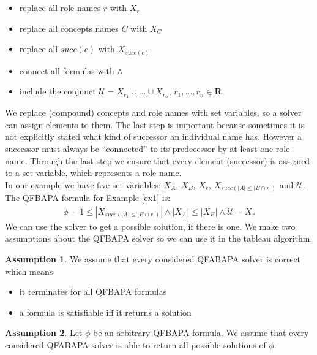 \documentclass{book}
\theoremstyle{break}
\theoremstyle{definition}
\newtheorem{assumption}{Assumption}
\begin{document}
\begin{itemize}
\item replace all role names $r$ with $X_r$
\item replace all concepts names $C$ with $X_C$
\item replace all $succ(c)$ with $X_{succ(c)}$
\item connect all formulas with $\wedge$
\item include the conjunct $\mathcal{U}=X_{r_1}\cup\dots\cup X_{r_n}$, $r_1,\dots, r_n\in\mathbf{R}$
\end{itemize}
We replace (compound) concepts and role names with set variables, so a solver can assign elements to them. The last step is important because sometimes it is not explicitly stated what kind of successor an individual name has. However a successor must always be ``connected'' to its predecessor by at least one role name. Through the last step we ensure that every element (successor) is assigned to a set variable, which represents a role name.\\
In our example we have five set variables: $X_A$, $X_B$, $X_r$, $X_{succ(|A|\leq |B\cap r|)}$ and $\mathcal{U}$. The QFBAPA formula for Example \ref{ex1} is:
\begin{align}\label{f}
\phi=1\leq |X_{succ(|A|\leq |B\cap r|)}|\wedge |X_A|\leq |X_B|\wedge \mathcal{U}=X_r
\end{align}
We can use the solver to get a possible solution, if there is one. We make two assumptions about the QFBAPA solver so we can use it in the tableau algorithm.
\begin{assumption}\label{assumption1}
We assume that every considered QFABAPA solver is correct which means
\begin{itemize}
\item it terminates for all QFBAPA formulas
\item a formula is satisfiable iff it returns a solution
\end{itemize}
\end{assumption}
\begin{assumption}\label{assumption2}
Let $\phi$ be an arbitrary QFBAPA formula. We assume that every considered QFABAPA solver is able to return all possible solutions of $\phi$.
\end{assumption}
\end{document}
